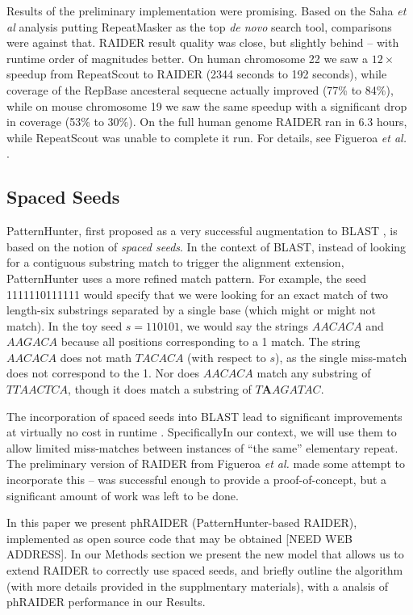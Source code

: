 \documentclass{bmcart}
\begin{document}
Results of the preliminary implementation were promising.  Based on
the Saha {\it et al} analysis putting RepeatMasker as the top {\it de
  novo} search tool, comparisons were against that.  RAIDER result
quality was close, but slightly behind -- with runtime
order of magnitudes better.  On human chromosome 22 we saw a
$12\times$ speedup from RepeatScout to RAIDER (2344 seconds to 192 seconds), while coverage
of the RepBase ancesteral sequecne \cite{Jurka:2005bl} actually improved (77\% to 84\%), while on mouse chromosome 19 we saw 
the same speedup with a significant drop in coverage (53\% to 30\%).  On
the full human genome RAIDER ran in $6.3$ hours, while RepeatScout was
unable to complete it run.  For details, see Figueroa {\it et al.} \cite{Figueroa:2014uk}.

\subsection*{Spaced Seeds}
 
PatternHunter, first proposed as a very successful augmentation to
BLAST \cite{Li:2004wl,Altschul:1997p843}, is based on the notion of {\it
  spaced seeds}.  In the context of BLAST, instead of looking for a
contiguous substring match to trigger the alignment extension,
PatternHunter uses a more refined match pattern.  For example, the
seed 1111110111111 would specify that we were looking for an exact
match of two length-six substrings separated by a single base (which
might or might not match).  In the toy seed $s=110101$, we would say the
strings $AACACA$ and $AAGACA$ because all positions corresponding to a
1 match.  The string $AACACA$ does not math $TACACA$ (with respect to
$s$), as the single miss-match does not correspond to the 1.  Nor does
$AACACA$ match any substring of $TTAACTCA$, though it does match a
substring of $T{\mathbf AAGATA}C$.

The incorporation of spaced seeds into BLAST lead to significant
improvements at virtually no cost in runtime \cite{Li:2004wl}.
SpecificallyIn our context, we will use them to allow limited
miss-matches between instances of ``the same'' elementary repeat.  The
preliminary version of RAIDER from Figueroa {\it et al.} made some
attempt to incorporate this -- was successful enough to provide a
proof-of-concept, but a significant amount of work was left to be
done.

In this paper we present phRAIDER (PatternHunter-based RAIDER),
implemented as open source code that may be obtained [NEED WEB
  ADDRESS].  In our Methods section we present the new model that
allows us to extend RAIDER to correctly use spaced seeds, and briefly
outline the algorithm (with more details provided in the supplmentary
materials), with a analsis of phRAIDER performance in our Results.
\end{document}
